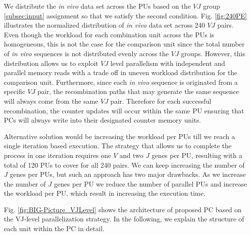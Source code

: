 We distribute the \emph{in vivo} data set across the PUs  based on the $VJ$ group \ref{subsec:input} assignment so that we satisfy the second condition. Fig. \ref{fig:240PE} illustrates the normalized distribution of \emph{in vivo} data set across 240 $VJ$ pairs. Even though the workload for each combination unit across the PUs is homogeneous, this is not the case for the comparison unit since the total number of \emph{in vivo} sequences is not distributed evenly across the $VJ$ groups. However, this distribution allows us to exploit $VJ$ level parallelism with independent and parallel memory reads with a trade off in uneven workload distribution for the comparison unit. Furthermore, since  each \emph{in vivo} sequence is originated from a specific $VJ$ pair, the recombination paths that may generate the same sequence will always come from the same $VJ$ pair. Therefore for each successful recombination, the counter updates will occur within the same PU ensuring that PCs will always write into  their designated counter memory units. 



Alternative solution would be increasing the workload per PUs till we reach a single iteration based execution. The strategy that allows us to complete the process in one iteration requires one $V$ and two $J$ genes per PU, resulting with a total of 120 PUs to cover for  all 240 pairs. We can keep increasing the number of $J$ genes per PUs, but such an approach has two major drawbacks. As we increase the number of $J$ genes per PU we reduce the number of parallel PUs and increase the workload per PU, which result in increasing the execution time.

Fig. \ref{fig:BIG-Picture_VJLevel} shows the architecture of proposed PC based on the VJ-level parallelization strategy. In the following, we explain the structure of each unit within the PC in detail.

